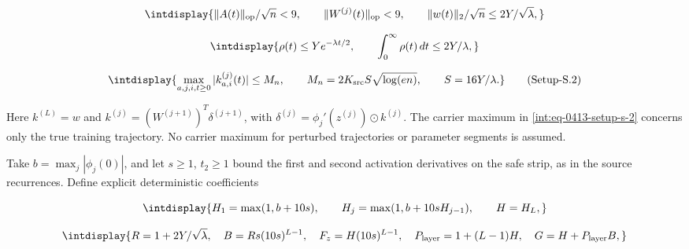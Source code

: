 \begingroup\renewcommand{\theHequation}{intdisplay.843}
\begin{equation*}
\intdisplay{
\|A(t)\|_{\rm op}/\sqrt n<9,\qquad
\|W^{(j)}(t)\|_{\rm op}<9,\qquad
\|w(t)\|_2/\sqrt n\le 2Y/\sqrt\lambda,
}
\end{equation*}
\endgroup

\begingroup\renewcommand{\theHequation}{intdisplay.844}
\begin{equation*}
\intdisplay{
\rho(t)\le Ye^{-\lambda t/2},\qquad
\int_0^\infty\rho(t)\,dt\le 2Y/\lambda,
}
\end{equation*}
\endgroup

\label{int:eq-setup-s-2}
\begingroup\renewcommand{\theHequation}{intdisplay.845}
\begin{equation}
\intdisplay{
\max_{a,j,i,t\ge0}|k_{a,i}^{(j)}(t)|\le M_n,
\qquad M_n=2K_{\rm src}S\sqrt{\log(en)},\qquad S=16Y/\lambda.
}
\tag{Setup-S.2}
\label{int:eq-0413-setup-s-2}
\end{equation}
\endgroup


Here \(k^{(L)}=w\) and \(k^{(j)}=(W^{(j+1)})^T\delta^{(j+1)}\), with \(\delta^{(j)}=\phi_j'(z^{(j)})\odot k^{(j)}\). The carrier maximum in \hyperref[int:eq-setup-s-2]{\eqref{int:eq-0413-setup-s-2}} concerns only the true training trajectory. No carrier maximum for perturbed trajectories or parameter segments is assumed.



Take \(b=\max_j|\phi_j(0)|\), and let \(s\ge1\), \(t_2\ge1\) bound the first and second activation derivatives on the safe strip, as in the source recurrences. Define explicit deterministic coefficients


\begingroup\renewcommand{\theHequation}{intdisplay.846}
\begin{equation*}
\intdisplay{
H_1=\max(1,b+10s),\qquad H_j=\max(1,b+10sH_{j-1}),\qquad H=H_L,
}
\end{equation*}
\endgroup

\begingroup\renewcommand{\theHequation}{intdisplay.847}
\begin{equation*}
\intdisplay{
R=1+2Y/\sqrt\lambda,\quad B=Rs(10s)^{L-1},\quad
F_z=H(10s)^{L-1},\quad P_{\rm layer}=1+(L-1)H,\quad
G=H+P_{\rm layer}B,
}
\end{equation*}
\endgroup

